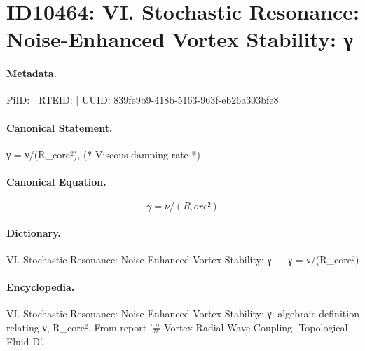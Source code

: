 \section*{ID10464: VI. Stochastic Resonance: Noise-Enhanced Vortex Stability: γ}
\paragraph{Metadata.}
PiID:  | RTEID:  | UUID: 839fe9b9-418b-5163-963f-eb26a303bfe8

\paragraph{Canonical Statement.}
γ = ν/(R\_core²), (* Viscous damping rate *)

\paragraph{Canonical Equation.}
\[
γ = ν/(R_core²)
\]

\paragraph{Dictionary.}
VI. Stochastic Resonance: Noise-Enhanced Vortex Stability: γ — γ = ν/(R\_core²)

\paragraph{Encyclopedia.}
VI. Stochastic Resonance: Noise-Enhanced Vortex Stability: γ: algebraic definition relating ν, R\_core². From report '\# Vortex-Radial Wave Coupling- Topological Fluid D'.
